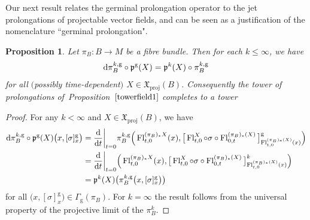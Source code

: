 \documentclass[pdftex]{sigma}
\numberwithin{equation}{section}
\newtheorem{Proposition}[Theorem]{Proposition}
\def\g{\operatorname{g}}
\def\id{\operatorname{id}}
\def\proj{\operatorname{proj}}
\def\Fl{\operatorname{Fl}}
\def\XF{{\mathfrak{X}}}
\def\pf{{\mathfrak{p}}}
\begin{document}
Our next result relates the germinal prolongation operator to the jet prolongations of projectable vector fields, and can be seen as a justification of the nomenclature ``germinal prolongation".

\begin{Proposition}\label{germprol}
Let $\pi_{B}\colon B\rightarrow M$ be a fibre bundle. Then for each $k\leq\infty$, we have
\begin{gather*}
{\rm d}\pi_{B}^{k,\g}\circ \pf^{\g}(X) = \pf^{k}(X)\circ\pi_{B}^{k,\g}
\end{gather*}
for all $($possibly time-dependent$)$ $X\in\XF_{\proj}(B)$. Consequently the tower of prolongations of~Pro\-po\-si\-tion~$\ref{towerfield1}$ completes to a tower
\begin{center}
\end{center}
\end{Proposition}

\begin{proof}
For any $k<\infty$ and $X\in\XF_{\proj}(B)$, we have
\begin{align*}
{\rm d}\pi_{B}^{k,\g}\circ\pf^{\g}(X)\big(x,[\sigma]^{\g}_{x}\big)
&= \frac{\rm d}{{\rm d}t}\bigg|_{t=0}\pi_{B}^{k,\g}\Big(\Fl^{(\pi_{B})_{*}X}_{t,0}(x),
\big[\Fl^{X}_{t,0}\circ\sigma\circ\Fl^{(\pi_{B})_{*}(X)}_{0,t}\big]^{\g}_{\Fl_{t,0}^{(\pi_{B})_{*}(X)}(x)}\Big)
\\
&= \frac{\rm d}{{\rm d}t}\bigg|_{t=0}\Big(\Fl^{(\pi_{B})_{*}X}_{t,0}(x), \big[\Fl^{X}_{t,0}\circ\sigma\circ\Fl^{(\pi_{B})_{*}(X)}_{0,t}\big]^{k}_{\Fl^{(\pi_{B})_{*}(X)}_{t,0}(x)}\Big)
\\
&= \pf^{k}(X)\big(\pi_{B}^{k,\g}\big(x,[\sigma]^{\g}_{x}\big)\big)
\end{align*}
for all $\big(x,[\sigma]^{\g}_{x}\big)\in\Gamma_{\g}(\pi_{B})$. For $k=\infty$ the result follows from the universal property of the projective limit of the $\pi_{B}^{k}$.
\end{proof}
\end{document}
